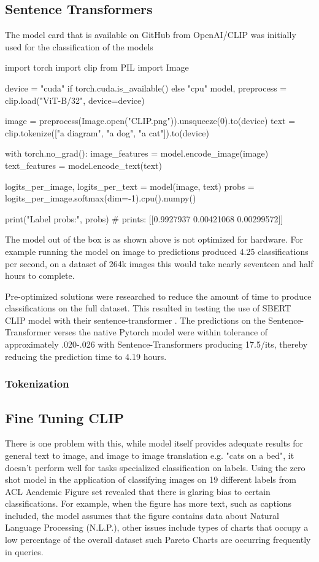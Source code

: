 \documentclass[article, 10pt]{article}
\begin{document}
\subsection{Sentence Transformers}
The model card that is available on GitHub from OpenAI/CLIP was initially used for the classification of the models
\begin{python}
import torch
import clip
from PIL import Image

device = "cuda" if torch.cuda.is_available() else "cpu"
model, preprocess = clip.load("ViT-B/32", device=device)

image = preprocess(Image.open("CLIP.png")).unsqueeze(0).to(device)
text = clip.tokenize(["a diagram", "a dog", "a cat"]).to(device)

with torch.no_grad():
    image_features = model.encode_image(image)
    text_features = model.encode_text(text)
    
    logits_per_image, logits_per_text = model(image, text)
    probs = logits_per_image.softmax(dim=-1).cpu().numpy()

print("Label probs:", probs)  # prints: [[0.9927937  0.00421068 0.00299572]]
\end{python} \cite{OpenAI}
The model out of the box is as shown above is not optimized for hardware. For example running the model on image to predictions produced 4.25 classifications per second, on a dataset of 264k images this would take nearly seventeen and half hours to complete. 

Pre-optimized solutions were researched to reduce the amount of time to produce classifications on the full dataset. This resulted in testing the use of SBERT CLIP model with their sentence-transformer \cite{SBERT}.
The predictions on the Sentence-Transformer verses the native Pytorch model were within
tolerance of approximately .020-.026 with Sentence-Transformers producing 17.5/its, thereby reducing the prediction time to 4.19 hours.

\subsubsection{Tokenization}

\subsection{Fine Tuning CLIP}
There is one problem with this, while model itself provides adequate results for general text to image, and image to image translation e.g. "cats on a bed", it doesn't perform well for tasks specialized classification on labels.
Using the zero shot model in the application of classifying images on 19 different labels from ACL Academic Figure set revealed that there is glaring bias to certain classifications. For example, when the figure has more text, such as captions included, the model assumes that the figure contains data about Natural Language Processing (N.L.P.), other issues include types of charts that occupy
a low percentage of the overall dataset such Pareto Charts are occurring frequently in queries. 
\end{document}
